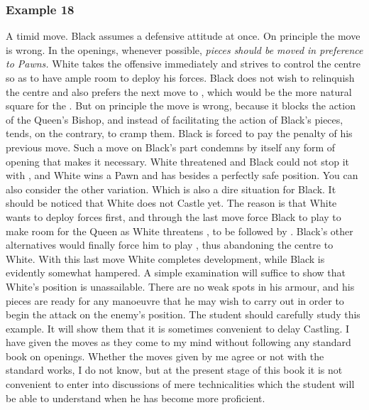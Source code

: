 \documentclass[11pt,a4paper]{book}
\begin{document}
\subsubsection*{Example 18}
\newgame
\styleC
{} A timid move. Black assumes a defensive attitude at once. On principle the move is wrong. In the openings, whenever possible, \emph{pieces should be moved in preference to Pawns.}
White takes the offensive immediately and strives to control the centre so as to have ample room to deploy his forces.
 Black does not wish to relinquish the centre and also prefers the next move to , which would be the more natural square for the \knight . But on principle the move is wrong, because it blocks the action of the Queen's Bishop, and instead of facilitating the action of Black's pieces, tends, on the contrary, to cramp them.
 Black is forced to pay the penalty of his previous move. Such a move on Black's part condemns by itself any form of opening that makes it necessary. White threatened  and Black could not stop it with , and White wins a Pawn and has besides a perfectly safe position. You can also consider the other variation.
 Which is also a dire situation for Black.
 It should be noticed that White does not Castle yet. The reason is that White wants to deploy forces first, and through the last move force Black to play  to make room for the Queen as White threatens , to be followed by . Black's other alternatives would finally force him to play , thus abandoning the centre to White.
 With this last move White completes development, while Black is evidently somewhat hampered. A simple examination will suffice to show that White's position is unassailable. There are no weak spots in his armour, and his pieces are ready for any manoeuvre that he may wish to carry out in order to begin the attack on the enemy's position. The student should carefully study this example. It will show them that it is sometimes convenient to delay Castling. I have given the moves as they come to my mind without following any standard book on openings. Whether the moves given by me agree or not with the standard works, I do not know, but at the present stage of this book it is not convenient to enter into discussions of mere technicalities which the student will be able to understand when he has become more proficient.
\end{document}
